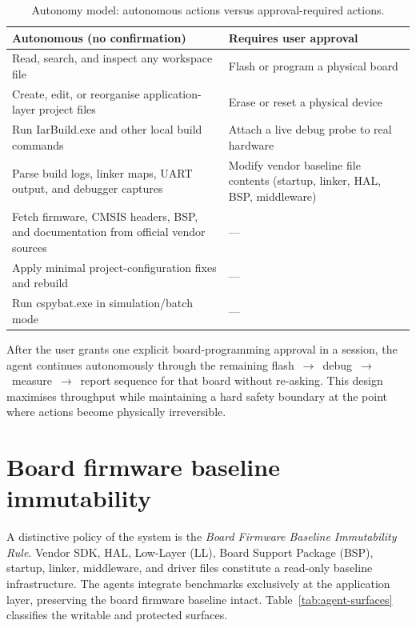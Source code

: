\begin{table}[H]
\centering
\caption{Autonomy model: autonomous actions versus approval-required actions.}
\label{tab:agent-autonomy}
\begin{tabularx}{\textwidth}{X X}
\toprule
\textbf{Autonomous (no confirmation)} & \textbf{Requires user approval} \\
\midrule
Read, search, and inspect any workspace file &
Flash or program a physical board \\

Create, edit, or reorganise application-layer project files &
Erase or reset a physical device \\

Run IarBuild.exe and other local build commands &
Attach a live debug probe to real hardware \\

Parse build logs, linker maps, UART output, and debugger captures &
Modify vendor baseline file contents (startup, linker, HAL, BSP, middleware) \\

Fetch firmware, CMSIS headers, BSP, and documentation from official vendor sources &
--- \\

Apply minimal project-configuration fixes and rebuild &
--- \\

Run cspybat.exe in simulation/batch mode &
--- \\
\bottomrule
\end{tabularx}
\end{table}

After the user grants one explicit board-programming approval in a session, the agent
continues autonomously through the remaining flash~$\to$~debug~$\to$~measure~$\to$~report
sequence for that board without re-asking. This design maximises throughput while
maintaining a hard safety boundary at the point where actions become physically
irreversible.

\section{Board firmware baseline immutability}
\label{sec:agent-baseline}

A distinctive policy of the system is the \emph{Board Firmware Baseline Immutability Rule}.
Vendor SDK, HAL, Low-Layer (LL), Board Support Package (BSP), startup, linker,
middleware, and driver files constitute a read-only baseline infrastructure. The agents
integrate benchmarks exclusively at the application layer, preserving the board firmware
baseline intact. Table~\ref{tab:agent-surfaces} classifies the writable and protected
surfaces.

